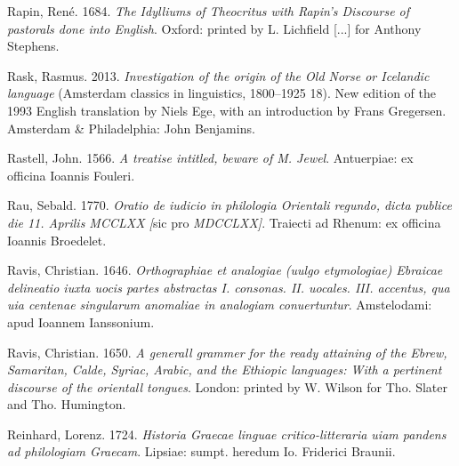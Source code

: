 \begin{styleStandard}
Rapin, René. 1684. \textit{The Idylliums of Theocritus with Rapin’s Discourse of pastorals done into English}. Oxford: printed by L. Lichfield [...] for Anthony Stephens.
\end{styleStandard}

\begin{styleStandard}
Rask, Rasmus. 2013. \textit{Investigation of the origin of the Old Norse or Icelandic language} (Amsterdam classics in linguistics, 1800–1925 18). New edition of the 1993 English translation by Niels Ege, with an introduction by Frans Gregersen. Amsterdam \& Philadelphia: John Benjamins.
\end{styleStandard}

\begin{styleStandard}
Rastell, John. 1566. \textit{A treatise intitled, beware of M. Jewel}. Antuerpiae: ex officina Ioannis Fouleri.
\end{styleStandard}

\begin{styleStandard}
Rau, Sebald. 1770. \textit{Oratio de iudicio in philologia Orientali regundo, dicta publice die 11. Aprilis MCCLXX [}sic pro \textit{MDCCLXX]}. Traiecti ad Rhenum: ex officina Ioannis Broedelet.
\end{styleStandard}

\begin{styleStandard}
Ravis, Christian. 1646. \textit{Orthographiae et analogiae (uulgo etymologiae) Ebraicae delineatio iuxta uocis partes abstractas I. consonas. II. uocales. III. accentus, qua uia centenae singularum anomaliae in analogiam conuertuntur}. Amstelodami: apud Ioannem Ianssonium.
\end{styleStandard}

\begin{styleStandard}
Ravis, Christian. 1650. \textit{A generall grammer for the ready attaining of the Ebrew, Samaritan, Calde, Syriac, Arabic, and the Ethiopic languages: With a pertinent discourse of the orientall tongues}. London: printed by W. Wilson for Tho. Slater and Tho. Humington.
\end{styleStandard}

\begin{styleStandard}
Reinhard, Lorenz. 1724. \textit{Historia Graecae linguae critico-litteraria uiam pandens ad philologiam Graecam}. Lipsiae: sumpt. heredum Io. Friderici Braunii.
\end{styleStandard}

